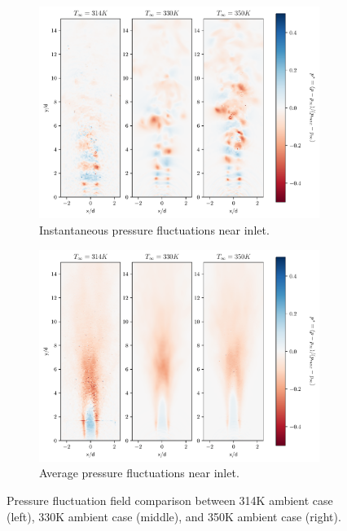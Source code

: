 \begin{figure}[H]
\begin{subfigure}{0.5\textwidth}
	\centering
	\includegraphics[scale=.45]{figures/Plots/vertical/pressure_scaled_vert_all_zoom.pdf}
	\caption{Instantaneous pressure fluctuations near inlet.} \label{all_pressure_1}
\end{subfigure}
\hfill
\begin{subfigure}{0.5\textwidth}
	\centering
	\includegraphics[scale=.45]{figures/Plots/vertical/pressure_scaled_vert_avg_all_zoom.pdf}
	\caption{Average pressure fluctuations near inlet.} \label{all_pressure_2}
\end{subfigure}
\caption{Pressure fluctuation field comparison between 314K ambient case (left), 330K ambient case (middle), and 350K ambient case (right).}
\label{all_pressure_features}
\end{figure}

